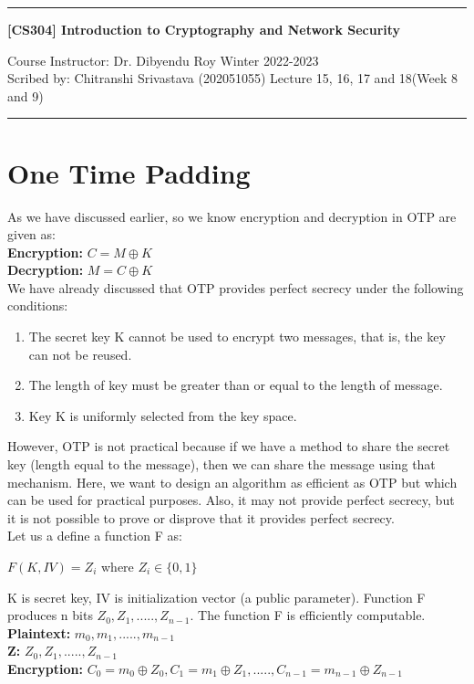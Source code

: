 \documentclass[11pt]{article}
\begin{document}
\noindent
\rule{\textwidth}{1pt}
\begin{center}
{\bf [CS304] Introduction to Cryptography and Network Security}
\end{center}
Course Instructor: Dr. Dibyendu Roy \hfill Winter 2022-2023\\
Scribed by: Chitranshi Srivastava (202051055) \hfill Lecture 15, 16, 17 and 18(Week 8 and 9)
\\
\rule{\textwidth}{1pt}

\section{One Time Padding}
As we have discussed earlier, so we know encryption and decryption in OTP are given as:\\
    \textbf{Encryption:} $C = M \oplus K$\\
    \textbf{Decryption:} $M = C \oplus K$\\ 
We have already discussed that OTP provides perfect secrecy under the following conditions:
\begin{enumerate}
    \item The secret key K cannot be used to encrypt two messages, that is, the key can not be reused.
    \item The length of key must be greater than or equal to the length of message.
    \item Key K is uniformly selected from the key space.
\end{enumerate}

However, OTP is not practical because if we have a method to share the secret key (length equal to the message), then we can share the message using that mechanism. Here, we want to design an algorithm as efficient as OTP but which can be used for practical purposes. Also, it may not provide perfect secrecy, but it is not possible to prove or disprove that it provides perfect secrecy.\\
\vspace{3mm}
Let us a define a function F as:
\begin{center}
    $F(K, IV) = Z_i$ where $Z_i \in \{0, 1\}$
\end{center}
K is secret key, IV is initialization vector (a public parameter). Function F produces n bits $Z_0, Z_1,....., Z_{n-1}$. The function F is efficiently computable.\\
    \textbf{Plaintext:} $m_0, m_1,....., m_{n-1}$\\
    \textbf{Z:} $Z_0, Z_1,....., Z_{n-1}$\\
    \textbf{Encryption:} $C_0 = m_0 \oplus Z_0, C_1 = m_1 \oplus Z_1,....., C_{n-1} = m_{n-1} \oplus Z_{n-1}$\\
\end{document}
